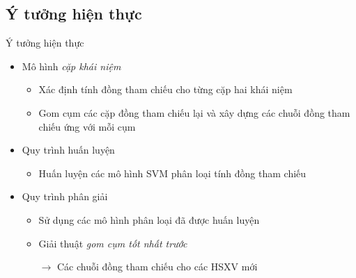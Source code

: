 \subsection{Ý tưởng hiện thực}
\begin{frame}{Ý tưởng hiện thực}
\putlogo
\begin{itemize}
	\item Mô hình \emph{cặp khái niệm}
	\begin{itemize}
		\item Xác định tính đồng tham chiếu cho từng cặp hai khái niệm
		\item Gom cụm các cặp đồng tham chiếu lại và xây dựng các chuỗi đồng tham chiếu ứng với mỗi cụm
	\end{itemize}
	\item Quy trình huấn luyện
	\begin{itemize}
		\item Huấn luyện các mô hình SVM phân loại tính đồng tham chiếu 
	\end{itemize}
	\item Quy trình phân giải
	\begin{itemize}
		\item Sử dụng các mô hình phân loại đã được huấn luyện
		\item Giải thuật \emph{gom cụm tốt nhất trước}
		\item[\boldmath$\rightarrow$] Các chuỗi đồng tham chiếu cho các HSXV mới
	\end{itemize}
\end{itemize}
\end{frame}

